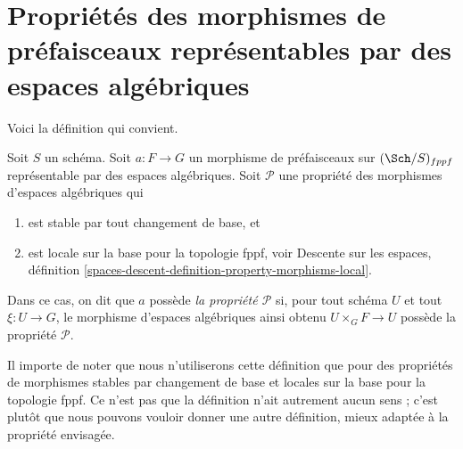 \section{Propriétés des morphismes de préfaisceaux représentables par des espaces algébriques}
\label{section-representable-by-spaces-properties}

\noindent
Voici la définition qui convient.

\begin{definition}
\label{definition-property-transformation}
Soit $S$ un schéma. Soit $a : F \to G$ un morphisme de préfaisceaux sur
$(\Sch/S)_{fppf}$ représentable par des espaces algébriques.
Soit $\mathcal{P}$ une propriété des morphismes d'espaces algébriques qui
\begin{enumerate}
\item est stable par tout changement de base, et
\item est locale sur la base pour la topologie fppf, voir
Descente sur les espaces,
définition \ref{spaces-descent-definition-property-morphisms-local}.
\end{enumerate}
Dans ce cas, on dit que $a$ possède {\it la propriété $\mathcal{P}$} si, pour tout
schéma $U$ et tout $\xi : U \to G$, le morphisme d'espaces algébriques ainsi obtenu
$U \times_G F \to U$ possède la propriété $\mathcal{P}$.
\end{definition}

\noindent
Il importe de noter que nous n'utiliserons cette définition que pour
des propriétés de morphismes stables par changement de base et
locales sur la base pour la topologie fppf. Ce n'est
pas que la définition n'ait autrement aucun sens ; c'est plutôt que
nous pouvons vouloir donner une autre définition, mieux
adaptée à la propriété envisagée.

